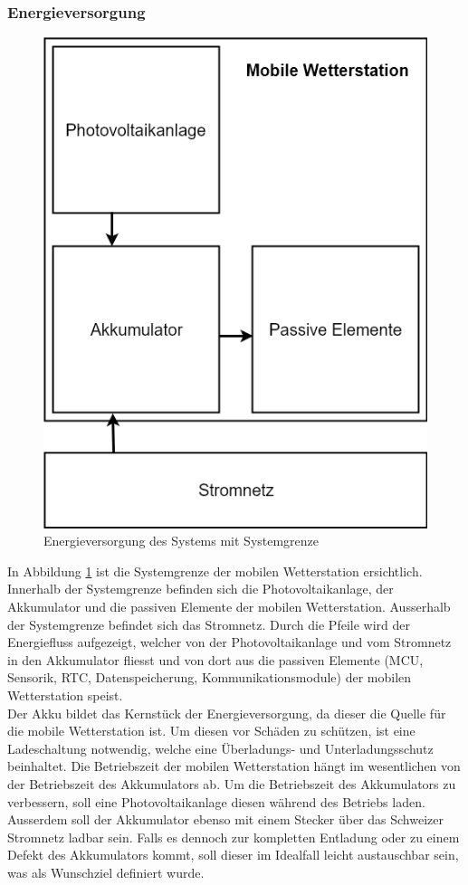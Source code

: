 \subsubsection{Energieversorgung}
\begin{figure}[h]
\centering
\includegraphics[scale=0.5]{graphics/Konzeptdiagramme/Energieversorgung_1.PNG}
\caption{Energieversorgung des Systems mit Systemgrenze}
\label{fig:Energieversorgung_1}
\end{figure}
In Abbildung \ref{fig:Energieversorgung_1} ist die Systemgrenze der mobilen Wetterstation ersichtlich. Innerhalb der Systemgrenze befinden sich die Photovoltaikanlage, der Akkumulator und die passiven Elemente der mobilen Wetterstation. Ausserhalb der Systemgrenze befindet sich das Stromnetz. Durch die Pfeile wird der Energiefluss aufgezeigt, welcher von der Photovoltaikanlage und vom Stromnetz in den Akkumulator fliesst und von dort aus die passiven Elemente (MCU, Sensorik, RTC, Datenspeicherung, Kommunikationsmodule) der mobilen Wetterstation speist.\\
Der Akku bildet das Kernstück der Energieversorgung, da dieser die Quelle für die mobile Wetterstation ist. Um diesen vor Schäden zu schützen, ist eine Ladeschaltung notwendig, welche eine Überladungs- und Unterladungsschutz beinhaltet. Die Betriebszeit der mobilen Wetterstation hängt im wesentlichen von der Betriebszeit des Akkumulators ab. Um die Betriebszeit des Akkumulators zu verbessern, soll eine Photovoltaikanlage diesen während des Betriebs laden. Ausserdem soll der Akkumulator ebenso mit einem Stecker über das Schweizer Stromnetz ladbar sein. Falls es dennoch zur kompletten Entladung oder zu einem Defekt des Akkumulators kommt, soll dieser im Idealfall leicht austauschbar sein, was als Wunschziel definiert wurde.\\